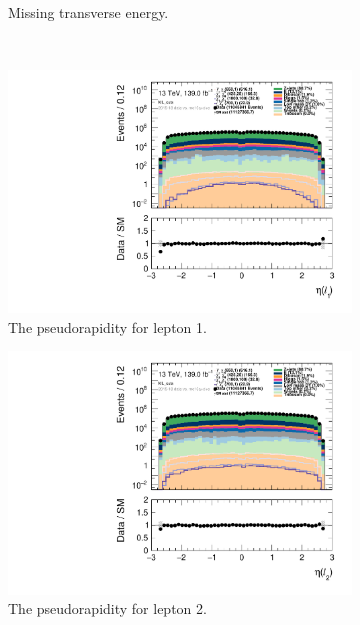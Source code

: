 \begin{figure}[H]
\begin{subfigure}[t!]{0.49\textwidth}
    \caption{Missing transverse energy.}
    \label{fig:my_label}
    \end{subfigure}
    \\
    \begin{subfigure}[t!]{0.49\textwidth}
        \includegraphics[width=\textwidth]{Figures/ML_cuts/hist1d_lepEta[0]_ML_cuts.pdf}
    \caption{The pseudorapidity for lepton 1.}
    \label{fig:my_label}
    \end{subfigure}
    \begin{subfigure}[t!]{0.49\textwidth}
        \includegraphics[width=\textwidth]{Figures/ML_cuts/hist1d_lepEta[1]_ML_cuts.pdf}
    \caption{The pseudorapidity for lepton 2.}
    \label{fig:my_label}
    \end{subfigure}
    \\
    \begin{subfigure}[t!]{0.49\textwidth}

\end{subfigure}
\end{figure}
